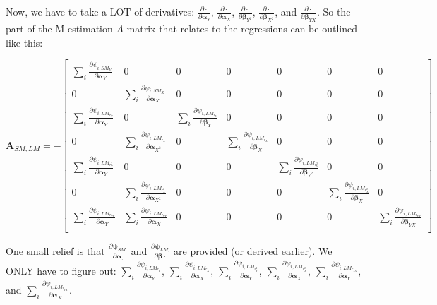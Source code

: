 \documentclass[]{article}
\begin{document}
Now, we have to take a LOT of derivatives: $\frac{\partial \cdot}{\partial \pmb{\alpha}_Y}$, $\frac{\partial \cdot}{\partial \pmb{\alpha}_X}$, $\frac{\partial \cdot}{\partial \pmb{\beta}_{Y^2}}$, $\frac{\partial \cdot}{\partial \pmb{\beta}_{X^2}}$, and $\frac{\partial \cdot}{\partial \pmb{\beta}_{YX}}$. So the part of the M-estimation $A$-matrix that relates to the regressions can be outlined like this:

\[
\pmb{A}_{SM, LM} = -
	\begin{bmatrix}
		\sum_i\frac{\partial \psi_{i,SM_{Y}}}{\partial \pmb{\alpha}_Y} & 0  & 0  & 0  & 0 & 0 & 0\\
		0 & \sum_i\frac{\partial \psi_{i,SM_{X}}}{\partial \pmb{\alpha}_X} & 0  & 0  & 0 & 0 & 0  \\
		\sum_i\frac{\partial \psi_{i,LM_{r_Y}}}{\partial \pmb{\alpha}_Y} & 0  & \sum_i\frac{\partial \psi_{i,LM_{r_Y}}}{\partial \pmb{\beta}_Y}  & 0  & 0 & 0 & 0 \\
		0  & \sum_i\frac{\partial \psi_{i,LM_{r_X}}}{\partial \pmb{\alpha}_{X^2}} & 0 & \sum_i\frac{\partial \psi_{i,LM_{r_X}}}{\partial \pmb{\beta}_X}  & 0  & 0 & 0 \\
		\sum_i\frac{\partial \psi_{i,LM_{r^2_Y}}}{\partial \pmb{\alpha}_Y} & 0 & 0 & 0  & \sum_i\frac{\partial \psi_{i,LM_{r^2_Y}}}{\partial \pmb{\beta}_{Y^2}}  & 0  & 0  \\
		0 & \sum_i\frac{\partial \psi_{i,LM_{r^2_X}}}{\partial \pmb{\alpha}_{X^2}} & 0 & 0 & 0  & \sum_i\frac{\partial \psi_{i,LM_{r^2_X}}}{\partial \pmb{\beta}_X}  & 0  \\
		\sum_i\frac{\partial \psi_{i,LM_{r_{YX}}}}{\partial \pmb{\alpha}_Y} & \sum_i\frac{\partial \psi_{i,LM_{r_{YX}}}}{\partial \pmb{\alpha}_X} & 0 & 0  & 0  & 0  & \sum_i\frac{\partial \psi_{i,LM_{r_{YX}}}}{\partial \pmb{\beta}_{YX}} \\
 	\end{bmatrix} 
\]

One small relief is that $\frac{\partial \pmb{\psi}_{SM_{\cdot}}}{\partial \pmb{\alpha_{\cdot}}}$ and $\frac{\partial \pmb{\psi}_{LM_{\cdot}}}{\partial \pmb{\beta{\cdot}}}$ are provided (or derived earlier). We ONLY have to figure out: $\sum_i\frac{\partial \psi_{i,LM_{r_Y}}}{\partial \pmb{\alpha}_Y}$,   $\sum_i\frac{\partial \psi_{i,LM_{r_X}}}{\partial \pmb{\alpha}_X}$, $\sum_i\frac{\partial \psi_{i,LM_{r^2_Y}}}{\partial \pmb{\alpha}_Y}$, $\sum_i\frac{\partial \psi_{i,LM_{r^2_X}}}{\partial \pmb{\alpha}_X}$, $\sum_i\frac{\partial \psi_{i,LM_{r_{YX}}}}{\partial \pmb{\alpha}_Y}$, and  $\sum_i\frac{\partial \psi_{i,LM_{r_{YX}}}}{\partial \pmb{\alpha}_X}$.
\end{document}
